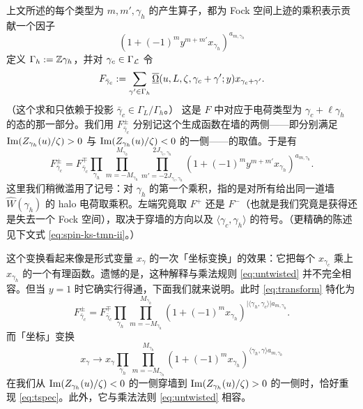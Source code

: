 上文所述的每个类型为 $m, m', \gamma_h$ 的产生算子，都为 Fock 空间上迹的乘积表示贡献一个因子
\begin{equation}
(1 + (-1)^{m} y^{m+m'} x_{\gamma_h} )^{  a_{m,\gamma_h}}
\end{equation}
定义 $\Gamma_h := \mathbb{Z} \gamma_h$，并对 $\gamma_c \in \Gamma_{\mathcal{L}}$ 令
\begin{equation}
F_{\bar \gamma_c} := \sum_{\gamma'\in \Gamma_h} \overline{\underline{\Omega}}(u, L, \zeta,
\gamma_c +\gamma'; y) x_{\gamma_c+\gamma'}.
\end{equation}
（这个求和只依赖于投影 $\bar\gamma_c\in \Gamma_L/\Gamma_h$。）
这是 $F$ 中对应于电荷类型为 $\gamma_c + \ell \gamma_h$ 的态的那一部分。我们用 $F_{\bar\gamma_c}^\pm$ 分别记这个生成函数在墙的两侧——即分别满足 ${\rm Im}(Z_{\gamma_h}(u)/\zeta)>0$ 与 ${\rm Im}(Z_{\gamma_h}(u)/\zeta)<0$ 的一侧——的取值。于是有
\begin{equation} \label{eq:transform}
F^\pm_{\bar\gamma_c} = F^\mp_{\bar\gamma_c}  \prod_{\gamma_h}
\prod_{m=-M_{\gamma_h}}^{M_{\gamma_h}} \prod_{m'= - 2J_{\gamma_c,
\gamma_h}}^{2J_{\gamma_c, \gamma_h}} (1 + (-1)^{m } y^{m+m'}
x_{\gamma_h} )^{  a_{m,\gamma_h}}.
\end{equation}
这里我们稍微滥用了记号：对 $\gamma_h$ 的第一个乘积，指的是对所有给出同一道墙 $\widehat{W}(\gamma_h)$ 的 halo 电荷取乘积。左端究竟取 $F^+$ 还是 $F^-$（也就是我们究竟是获得还是失去一个 Fock 空间），取决于穿墙的方向以及 $\langle \gamma_c,\gamma_h\rangle$ 的符号。（更精确的陈述见下文式 \eqref{eq:spin-ks-tmn-ii}。）

这个变换看起来像是形式变量 $x_\gamma$ 的一次「坐标变换」的效果：它把每个 $x_{\gamma_c}$ 乘上 $x_{\gamma_h}$ 的一个有理函数。遗憾的是，这种解释与乘法规则 \eqref{eq:untwisted} 并不完全相容。但当 $y=1$ 时它确实行得通，下面我们就来说明。此时 \eqref{eq:transform} 特化为
\begin{equation} \label{eq:tspec}
F^\pm_{\bar\gamma_c}  = F^\mp_{\bar\gamma_c}  \prod_{\gamma_h}
\prod_{m=-M_{\gamma_h}}^{M_{\gamma_h}} (1 + (-1)^{m}
x_{\gamma_h} )^{  \lvert \langle \gamma_h, \gamma_c\rangle \rvert a_{m,\gamma_h} }.
\end{equation}
而「坐标」变换
\begin{equation}\label{eq:y-one-prod}
x_\gamma \to x_\gamma  \prod_{\gamma_h}
\prod_{m=-M_{\gamma_h}}^{M_{\gamma_h}}  (1 + (-1)^{m } x_{\gamma_h} )^{\langle \gamma_h, \gamma\rangle a_{m,\gamma_h}}
\end{equation}
在我们从 ${\rm Im}(Z_{\gamma_h}(u)/\zeta) < 0$ 的一侧穿墙到 ${\rm Im}(Z_{\gamma_h}(u)/\zeta) > 0$ 的一侧时，恰好重现 \eqref{eq:tspec}。此外，它与乘法法则 \eqref{eq:untwisted} 相容。

